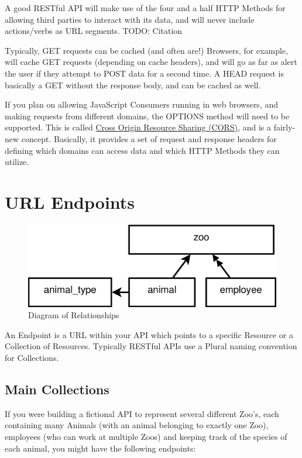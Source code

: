 \documentclass{book}
\begin{document}
A good RESTful API will make use of the four and a half HTTP Methods for allowing third parties to interact with its data, and will never include actions/verbs as URL segments. TODO: Citation

Typically, GET requests can be cached (and often are!) Browsers, for example, will cache GET requests (depending on cache headers), and will go as far as alert the user if they attempt to POST data for a second time. A HEAD request is basically a GET without the response body, and can be cached as well.

If you plan on allowing JavaScript Consumers running in web browsers, and making requests from different domains, the OPTIONS method will need to be supported. This is called \href{https://en.wikipedia.org/wiki/Cross-origin_resource_sharing}{Cross Origin Resource Sharing (CORS)}, and is a fairly-new concept. Basically, it provides a set of request and response headers for defining which domains can access data and which HTTP Methods they can utilize.


\section{URL Endpoints}

\begin{figure}[ht!]
\centering
\includegraphics[scale=.5]{images/zoo-relationships.eps}
\caption{Diagram of Relationships}
\label{fig:zoorelationships}
\end{figure}

An Endpoint is a URL within your API which points to a specific Resource or a Collection of Resources. Typically RESTful APIs use a Plural naming convention for Collections.

\subsection{Main Collections}

If you were building a fictional API to represent several different Zoo's, each containing many Animals (with an animal belonging to exactly one Zoo), employees (who can work at multiple Zoos) and keeping track of the species of each animal, you might have the following endpoints:
\end{document}
